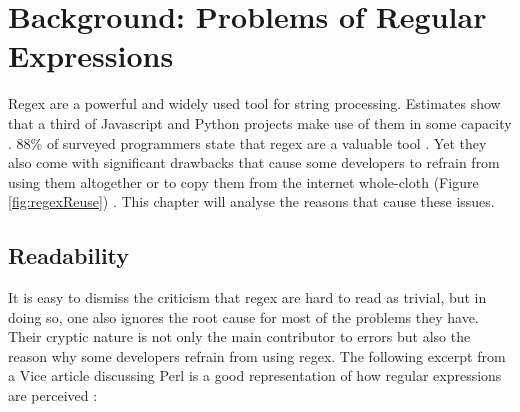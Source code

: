 \chapter{Background: Problems of Regular Expressions} \label{chapter:motivation}

Regex are a powerful and widely used tool for string processing. Estimates show that a third of Javascript and Python projects make use of them in some capacity \cite{RedosInPractice}. 88\% of surveyed programmers state that regex are a valuable tool \cite{RegexesAreHard}. Yet they also come with significant drawbacks that cause some developers to refrain from using them altogether or to copy them from the internet whole-cloth (Figure \ref{fig:regexReuse}) \cite{RegexesAreHard}. This chapter will analyse the reasons that cause these issues.

{
\hypersetup{citecolor=white}
\begin{boxFigure}[label=fig:regexReuse,title={Percentage of reused regex. Based on \cite{RegexNotLinguaFranca} figure 2.},width=15cm]
    \centering
\end{boxFigure}
}


\section{Readability}

It is easy to dismiss the criticism that regex are hard to read as trivial, but in doing so, one also ignores the root cause for most of the problems they have. Their cryptic nature is not only the main contributor to errors but also the reason why some developers refrain from using regex. The following excerpt from a Vice article discussing Perl is a good representation of how regular expressions are perceived \cite{ViceProgrammingLanguagesProgrammersHate}:

